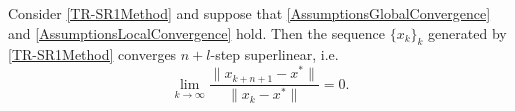 \begin{theorem} \label{LocalConvergence}
    Consider \cref{TR-SR1Method} and suppose that \cref{AssumptionsGlobalConvergence} and \cref{AssumptionsLocalConvergence} hold. Then the sequence $\{ x_k \}_k$ generated by \cref{TR-SR1Method} converges $n+l$-step superlinear, i.e. 
    \begin{equation}\label{n+1superlinear}
        \lim_{k \rightarrow \infty} \frac{\lVert x_{k+n+1} - x^* \rVert}{\lVert x_k - x^* \rVert} = 0.
    \end{equation}
\end{theorem}